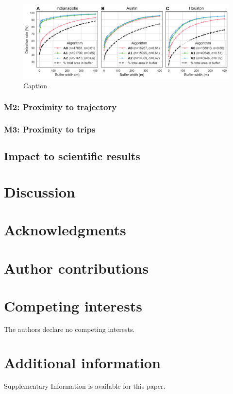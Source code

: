 \documentclass[pdflatex,sn-mathphys,lineno]{sn-jnl}%
\theoremstyle{thmstyleone}%
\theoremstyle{thmstyletwo}%
\theoremstyle{thmstylethree}%
\begin{document}
\begin{figure}[ht]
    \centering
    \includegraphics[width=\textwidth]{figures/Result - M1.png}
    \caption{Caption}
    \label{fig:my_label}
\end{figure}

\subsubsection{M2: Proximity to trajectory}


\subsubsection{M3: Proximity to trips}

\subsection{Impact to scientific results}

\section{Discussion}
\section*{Acknowledgments}

\section*{Author contributions}

\section*{Competing interests}
The authors declare no competing interests.

\section*{Additional information}
Supplementary Information is available for this paper.


\end{document}
